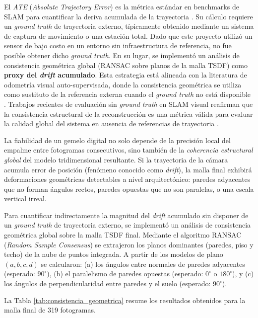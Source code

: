 \documentclass[12pt, a4, twoside, openany]{report}
\begin{document}
El \textit{ATE} (\textit{Absolute Trajectory Error}) es la métrica estándar en benchmarks de SLAM para cuantificar la deriva acumulada de la trayectoria \cite{TUM-RGBD, ICL-NUIM}. Su cálculo requiere un \textit{ground truth} de trayectoria externo, típicamente obtenido mediante un sistema de captura de movimiento o una estación total. Dado que este proyecto utilizó un sensor de bajo costo en un entorno sin infraestructura de referencia, no fue posible obtener dicho \textit{ground truth}. En su lugar, se implementó un análisis de consistencia geométrica global (RANSAC sobre planos de la malla TSDF) como \textbf{proxy del \textit{drift} acumulado}. Esta estrategia está alineada con la literatura de odometría visual auto-supervisada, donde la consistencia geométrica se utiliza como sustituto de la referencia externa cuando el \textit{ground truth} no está disponible \cite{iyer2018geometric}. Trabajos recientes de evaluación sin \textit{ground truth} en SLAM visual reafirman que la consistencia estructural de la reconstrucción es una métrica válida para evaluar la calidad global del sistema en ausencia de referencias de trayectoria \cite{fontan2024look}.

La fiabilidad de un gemelo digital no solo depende de la precisión local del empalme entre fotogramas consecutivos, sino también de la \textit{coherencia estructural global} del modelo tridimensional resultante. Si la trayectoria de la cámara acumula error de posición (fenómeno conocido como \textit{drift}), la malla final exhibirá deformaciones geométricas detectables a nivel arquitectónico: paredes adyacentes que no forman ángulos rectos, paredes opuestas que no son paralelas, o una escala vertical irreal.

Para cuantificar indirectamente la magnitud del \textit{drift} acumulado sin disponer de un \textit{ground truth} de trayectoria externo, se implementó un análisis de consistencia geométrica global sobre la malla TSDF final. Mediante el algoritmo RANSAC (\textit{Random Sample Consensus}) se extrajeron los planos dominantes (paredes, piso y techo) de la nube de puntos integrada. A partir de los modelos de plano $(a, b, c, d)$ se calcularon: (a) los ángulos entre normales de paredes adyacentes (esperado: $90^{\circ}$), (b) el paralelismo de paredes opuestas (esperado: $0^{\circ}$ o $180^{\circ}$), y (c) los ángulos de perpendicularidad entre paredes y el suelo (esperado: $90^{\circ}$).

La Tabla \ref{tab:consistencia_geometrica} resume los resultados obtenidos para la malla final de 319 fotogramas.
\end{document}
